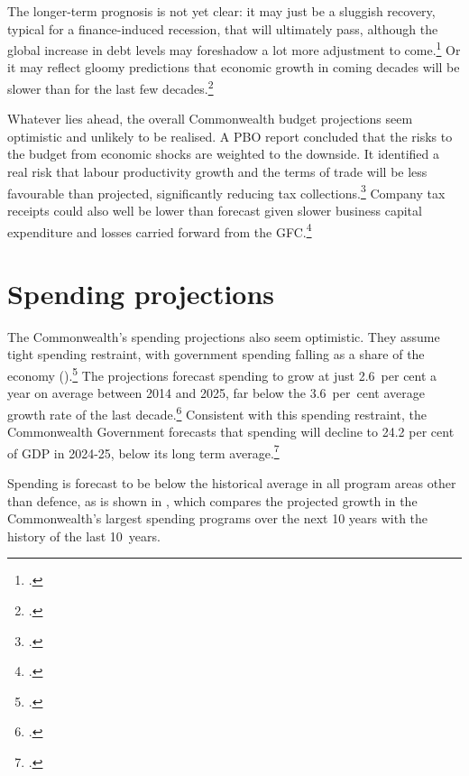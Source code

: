 \documentclass[twoside,english]{palatinob5ona4portrait}
\begin{document}
The longer-term prognosis is not yet clear:  it may just be a sluggish recovery, typical for a finance-induced recession, that will ultimately pass,  although the global increase in debt levels may foreshadow a lot more adjustment to come.\footcites{BailyBosworth2013}{RoxburghLundWimmerEtAl2011} Or it may reflect gloomy predictions that economic growth in coming decades will be slower than for the last few decades.\footcite[][footnote~23]{RoxburghLundWimmerEtAl2011} 

Whatever lies ahead, the overall Commonwealth budget projections seem optimistic and unlikely to be realised. A PBO report concluded that the risks to the budget from economic shocks are weighted to the downside. It identified a real risk that labour productivity growth and the terms of trade will be less favourable than projected, significantly reducing tax collections.\footcite{PBO2014TrendsAustralianGovtReceipts1982to2013}  Company tax receipts could also well be lower than forecast given slower business capital expenditure  and losses carried forward from the GFC.\footcite[][38--44]{RBA2015a}

\section{Spending projections}
The Commonwealth’s spending projections also seem optimistic. They assume tight spending restraint, with government spending falling as a share of the economy ().\footcite[][5--11]{Treasury2015BudgetPapers201516}  The projections forecast spending to grow at just 2.6~per cent a year on average between 2014 and 2025, far below the 3.6~per~cent average growth rate of the last decade.\footcite[][5]{PBO2015}  Consistent with this spending restraint, the Commonwealth Government forecasts that spending will decline to 24.2 per cent of GDP in 2024-25, below its long term average.\footcite[][3--9]{Treasury2015BudgetPapers201516}  

Spending is forecast to be below the historical average in all program areas other than defence, as is shown in , which compares the projected growth in the Commonwealth’s largest spending programs over the next 10 years with the history of the last 10~years. 
\end{document}
